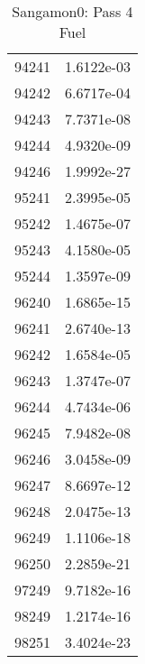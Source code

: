 \begin{table}[h!]
\begin{tabular}{|| c || c |}
94241 & 1.6122e-03 \\
94242 & 6.6717e-04 \\
94243 & 7.7371e-08 \\
94244 & 4.9320e-09 \\
94246 & 1.9992e-27 \\
95241 & 2.3995e-05 \\
95242 & 1.4675e-07 \\
95243 & 4.1580e-05 \\
95244 & 1.3597e-09 \\
96240 & 1.6865e-15 \\
96241 & 2.6740e-13 \\
96242 & 1.6584e-05 \\
96243 & 1.3747e-07 \\
96244 & 4.7434e-06 \\
96245 & 7.9482e-08 \\
96246 & 3.0458e-09 \\
96247 & 8.6697e-12 \\
96248 & 2.0475e-13 \\
96249 & 1.1106e-18 \\
96250 & 2.2859e-21 \\
97249 & 9.7182e-16 \\
98249 & 1.2174e-16 \\
98251 & 3.4024e-23 \\

\hline
\end{tabular}
\caption{Sangamon0: Pass 4 Fuel}
\label{table:sang0p4fuel}
\end{table}